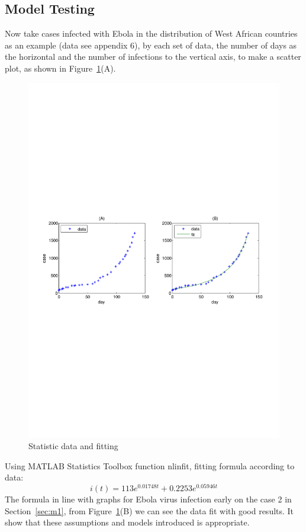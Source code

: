 \subsection{Model Testing}
Now take cases infected with Ebola in the distribution of West
African countries as an example \cite{bib5}(data see appendix
6), by each set of data, the number of days as the horizontal
and the number of infections to the vertical axis, to make a
scatter plot, as shown in Figure~\ref{fig:5}(A).
\begin{figure}
\centering
\includegraphics[width=4.7in]{imgs/sum_anly.pdf}
\caption{Statistic data and fitting}
\label{fig:5}
\end{figure}
Using MATLAB Statistics Toolbox function nlinfit, fitting
formula according to data:
\begin{equation}
i(t)=113e^{0.01748t}+0.2253e^{0.05946t}
\label{equ:14}
\end{equation}
The formula in line with graphs for Ebola
virus infection early on the case 2 in Section~\ref{sec:m1},
from Figure~\ref{fig:5}(B) we can see the data fit with good
results. It show that these assumptions and models
introduced is appropriate.
